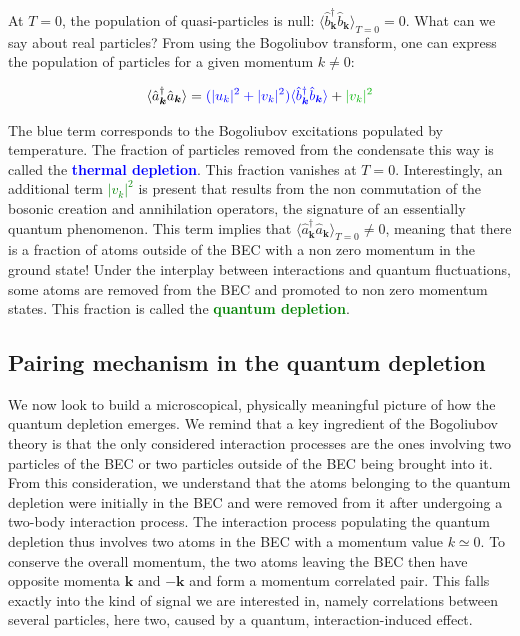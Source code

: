 \noindent At $T=0$, the population of quasi-particles is null: $\langle \hat{b}^{\dagger}_{\bm{k}}  \hat{b}_{\bm{k}} \rangle_{T=0}=0$. What can we say about real particles? From using the Bogoliubov transform, one can express the population of particles for a given momentum $k \neq 0$:

\begin{equation}
    \langle \hat{a}^{\dagger}_{\bm{k}}  \hat{a}_{\bm{k}} \rangle=\textcolor{blue}{(|u_k|^2+|v_k|^2)\langle \hat{b}^{\dagger}_{\bm{k}}  \hat{b}_{\bm{k}} \rangle} + \textcolor{green}{|v_k|^2}
\end{equation}

\noindent The blue term corresponds to the Bogoliubov excitations populated by temperature. The fraction of particles removed from the condensate this way is called the \textcolor{blue}{\textbf{thermal depletion}}. This fraction vanishes at $T=0$. Interestingly, an additional term \textcolor{green}{$|v_k|^2$} is present that results from the non commutation of the bosonic creation and annihilation operators, the signature of an essentially quantum phenomenon. This term implies that $\langle \hat{a}^{\dagger}_{\bm{k}}  \hat{a}_{\bm{k}} \rangle_{T=0} \neq 0$, meaning that there is a fraction of atoms outside of the BEC with a non zero momentum in the ground state! Under the interplay between interactions and quantum fluctuations, some atoms are removed from the BEC and promoted to non zero momentum states. This fraction is called the \textcolor{green}{\textbf{quantum depletion}}. 


\subsection{Pairing mechanism in the quantum depletion}

\label{sec:pairing_mechanism}

We now look to build a microscopical, physically meaningful picture of how the quantum depletion emerges. We remind that a key ingredient of the Bogoliubov theory is that the only considered interaction processes are the ones involving two particles of the BEC or two particles outside of the BEC being brought into it. From this consideration, we understand that the atoms belonging to the quantum depletion were initially in the BEC and were removed from it after undergoing a two-body interaction process. The interaction process populating the quantum depletion thus involves two atoms in the BEC with a momentum value $k \simeq 0$. To conserve the overall momentum, the two atoms leaving the BEC then have opposite momenta $\bm{k}$ and $-\bm{k}$ and form a momentum correlated pair. This falls exactly into the kind of signal we are interested in, namely correlations between several particles, here two, caused by a quantum, interaction-induced effect.

